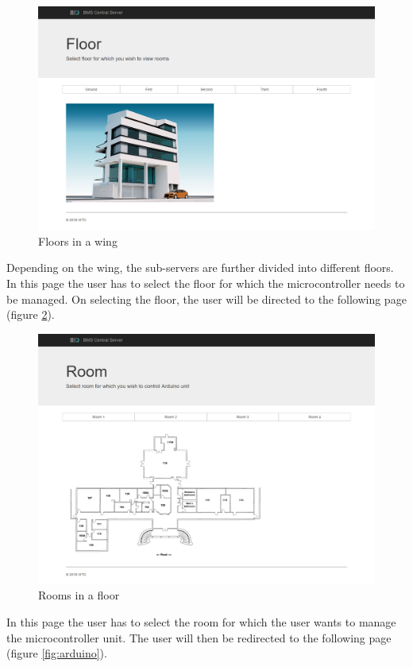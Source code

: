 \documentclass[letterpaper,11pt]{report}
\begin{document}
\newpage
\begin{figure}[h]
\includegraphics[width=\textwidth]{floor}
\centering
\captionsetup{justification=centering}
\caption{Floors in a wing}
\label{fig:floor}
\end{figure}
Depending on the wing, the sub-servers are further divided into different floors. In this page the user has to select the floor for which the microcontroller needs to be managed. On selecting the floor, the user will be directed to the following page (figure \ref{fig:room}).

\newpage
\begin{figure}[h]
\includegraphics[width=\textwidth]{room}
\centering
\captionsetup{justification=centering}
\caption{Rooms in a floor}
\label{fig:room}
\end{figure}
In this page the user has to select the room for which the user wants to manage the microcontroller unit. The user will then be redirected to the following page (figure \ref{fig:arduino}).
\end{document}
